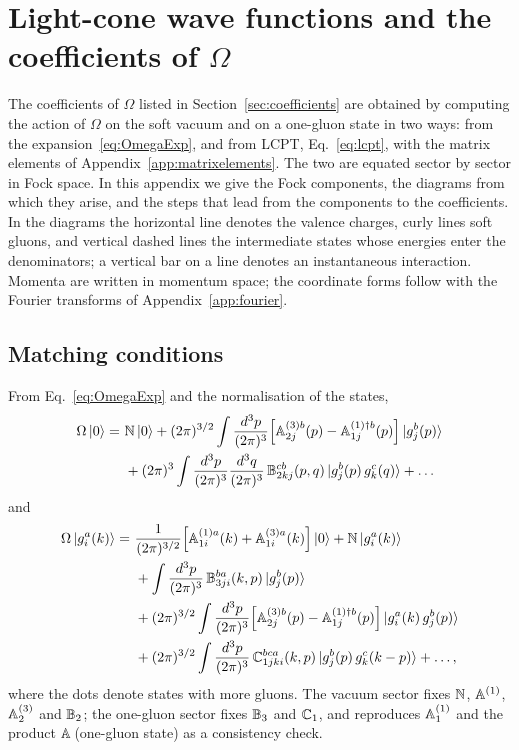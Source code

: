 \section{Light-cone wave functions and the coefficients of \texorpdfstring{$\Omega$}{Omega}}\label{app:wavefunctions}

The coefficients of $\Omega$ listed in Section~\ref{sec:coefficients} are obtained by computing the action of $\Omega$ on the soft vacuum and on a one-gluon state in two ways: from the expansion~\eqref{eq:OmegaExp}, and from LCPT, Eq.~\eqref{eq:lcpt}, with the matrix elements of Appendix~\ref{app:matrixelements}. The two are equated sector by sector in Fock space. In this appendix we give the Fock components, the diagrams from which they arise, and the steps that lead from the components to the coefficients. In the diagrams the horizontal line denotes the valence charges, curly lines soft gluons, and vertical dashed lines the intermediate states whose energies enter the denominators; a vertical bar on a line denotes an instantaneous interaction. Momenta are written in momentum space; the coordinate forms follow with the Fourier transforms of Appendix~\ref{app:fourier}.

\subsection{Matching conditions}

From Eq.~\eqref{eq:OmegaExp} and the normalisation of the states,
\begin{align}\label{eq:Omegavac}
\Omega\ket0=\ &\mathbb{N}\ket0+(2\pi)^{3/2}\int\frac{d^3p}{(2\pi)^3}\Big[\mathbb{A}^{(3)b}_{2j}(p)-\mathbb{A}^{(1)\dagger b}_{1j}(p)\Big]\ket{g^b_j(p)}\notag\\&+(2\pi)^3\int\frac{d^3p}{(2\pi)^3}\frac{d^3q}{(2\pi)^3}\,\mathbb{B}^{cb}_{2kj}(p,q)\ket{g^b_j(p)\,g^c_k(q)}+\dots
\end{align}
and
\begin{align}\label{eq:Omegag}
\Omega\ket{g^a_i(k)}=\ &\frac{1}{(2\pi)^{3/2}}\Big[\mathbb{A}^{(1)a}_{1i}(k)+\mathbb{A}^{(3)a}_{1i}(k)\Big]\ket0+\mathbb{N}\ket{g^a_i(k)}\notag\\&+\int\frac{d^3p}{(2\pi)^3}\,\mathbb{B}^{ba}_{3ji}(k,p)\ket{g^b_j(p)}
\notag\\&
+(2\pi)^{3/2}\int\frac{d^3p}{(2\pi)^3}\Big[\mathbb{A}^{(3)b}_{2j}(p)-\mathbb{A}^{(1)\dagger b}_{1j}(p)\Big]\ket{g^a_i(k)\,g^b_j(p)}
\notag\\&+(2\pi)^{3/2}\int\frac{d^3p}{(2\pi)^3}\,\mathbb{C}^{bca}_{1jki}(k,p)\ket{g^b_j(p)\,g^c_k(k-p)}+\dots,
\end{align}
where the dots denote states with more gluons. The vacuum sector fixes $\mathbb{N}$, $\mathbb{A}^{(1)}$, $\mathbb{A}^{(3)}_2$ and $\mathbb{B}_2$; the one-gluon sector fixes $\mathbb{B}_3$ and $\mathbb{C}_1$, and reproduces $\mathbb{A}^{(1)}_1$ and the product $\mathbb{A}\,$(one-gluon state) as a consistency check.

